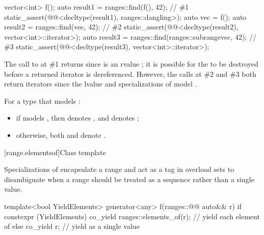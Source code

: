 \pnum
\begin{example}
\begin{codeblock}
vector<int> f();
auto result1 = ranges::find(f(), 42);                                   // \#1
static_assert(@@<decltype(result1), ranges::dangling>);
auto vec = f();
auto result2 = ranges::find(vec, 42);                                   // \#2
static_assert(@@<decltype(result2), vector<int>::iterator>);
auto result3 = ranges::find(ranges::subrange{vec}, 42);                 // \#3
static_assert(@@<decltype(result3), vector<int>::iterator>);
\end{codeblock}
The call to  at \#1 returns 
since  is an rvalue ;
it is possible for the  to be destroyed
before a returned iterator is dereferenced.
However, the calls at \#2 and \#3 both return iterators
since the lvalue  and specializations of 
model .
\end{example}

%
%
\pnum
For a type  that models :
\begin{itemize}
\item
if  models , then
 denotes , and
 denotes ;
\item
otherwise,
both  and 
denote .
\end{itemize}

[range.elementsof]{Class template }

Specializations of  encapsulate a range and
act as a tag in overload sets to disambiguate
when a range should be treated as a sequence
rather than a single value.

\begin{example}
\begin{codeblock}
template<bool YieldElements>
generator<any> f(ranges::@@ auto&& r) {
  if constexpr (YieldElements)
    co_yield ranges::elements_of(r);        // yield each element of 
  else
    co_yield r;                             // yield  as a single value
}
\end{codeblock}
\end{example}

